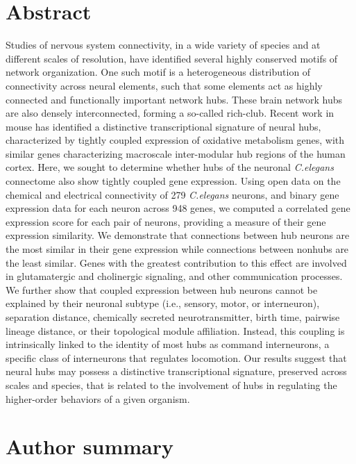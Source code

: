 \newpage

\section*{Abstract}
Studies of nervous system connectivity, in a wide variety of species and at different scales of resolution, have identified several highly conserved motifs of network organization.
One such motif is a heterogeneous distribution of connectivity across neural elements, such that some elements act as highly connected and functionally important network hubs.
These brain network hubs are also densely interconnected, forming a so-called rich-club.
Recent work in mouse has identified a distinctive transcriptional signature of neural hubs, characterized by tightly coupled expression of oxidative metabolism genes, with similar genes characterizing macroscale inter-modular hub regions of the human cortex.
Here, we sought to determine whether hubs of the neuronal \textit{C.elegans} connectome also show tightly coupled gene expression.
Using open data on the chemical and electrical connectivity of 279 \textit{C.elegans} neurons, and binary gene expression data for each neuron across 948 genes, we computed a correlated gene expression score for each pair of neurons, providing a measure of their gene expression similarity.
We demonstrate that connections between hub neurons are the most similar in their gene expression while connections between nonhubs are the least similar.
Genes with the greatest contribution to this effect are involved in glutamatergic and cholinergic signaling, and other communication processes.
We further show that coupled expression between hub neurons cannot be explained by their neuronal subtype (i.e., sensory, motor, or interneuron), separation distance, chemically secreted neurotransmitter, birth time, pairwise lineage distance, or their topological module affiliation.
Instead, this coupling is intrinsically linked to the identity of most hubs as command interneurons, a specific class of interneurons that regulates locomotion.
Our results suggest that neural hubs may possess a distinctive transcriptional signature, preserved across scales and species, that is related to the involvement of hubs in regulating the higher-order behaviors of a given organism.

\section*{Author summary}

